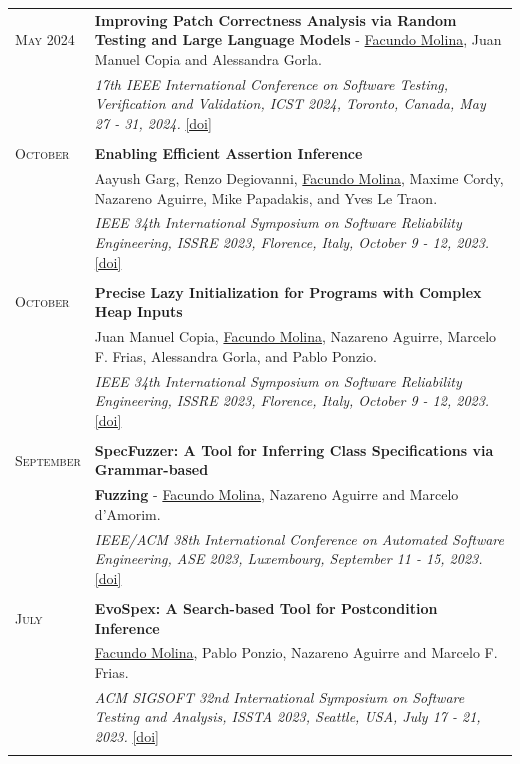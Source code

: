 \documentclass[a4paper,10pt]{article} %
\begin{document}
\begin{longtable}{>{\raggedleft\arraybackslash}p{} p{}}
\textsc{May} 2024 & \textbf{Improving Patch Correctness Analysis via Random Testing and Large Language Models} - \underline{Facundo Molina}, Juan Manuel Copia and Alessandra Gorla. \\
        & \textit{17th IEEE International Conference on Software Testing, Verification and Validation, ICST 2024, Toronto, Canada, May 27 - 31, 2024.} \href{https://doi.org/10.1109/ICST60714.2024.00036}{[doi]} \\ & \\

\textsc{October}  & \textbf{Enabling Efficient Assertion Inference} \\
        2023 & Aayush Garg, Renzo Degiovanni, \underline{Facundo Molina}, Maxime Cordy, Nazareno Aguirre, Mike Papadakis, and Yves Le Traon. \\
        & \textit{IEEE 34th International Symposium on Software Reliability Engineering, ISSRE 2023, Florence, Italy, October 9 - 12, 2023.} \href{https://doi.ieeecomputersociety.org/10.1109/ISSRE59848.2023.00039}{[doi]}\\ & \\

\textsc{October}  & \textbf{Precise Lazy Initialization for Programs with Complex Heap Inputs} \\
        2023 & Juan Manuel Copia, \underline{Facundo Molina}, Nazareno Aguirre, Marcelo F. Frias, Alessandra Gorla, and Pablo Ponzio. \\
        & \textit{IEEE 34th International Symposium on Software Reliability Engineering, ISSRE 2023, Florence, Italy, October 9 - 12, 2023.} \href{https://doi.ieeecomputersociety.org/10.1109/ISSRE59848.2023.00080}{[doi]}\\ & \\

\textsc{September} & \textbf{SpecFuzzer: A Tool for Inferring Class Specifications via Grammar-based} \\
        2023 & \textbf{Fuzzing} - \underline{Facundo Molina}, Nazareno Aguirre and Marcelo d'Amorim. \\
        & \textit{IEEE/ACM 38th International Conference on Automated Software Engineering, ASE 2023, Luxembourg, September 11 - 15, 2023.} \href{https://doi.ieeecomputersociety.org/10.1109/ASE56229.2023.00024}{[doi]}\\ & \\

\textsc{July}  & \textbf{EvoSpex: A Search-based Tool for Postcondition Inference} \\
2023 & \underline{Facundo Molina}, Pablo Ponzio, Nazareno Aguirre and Marcelo F. Frias. \\
& \textit{ACM SIGSOFT 32nd International Symposium on Software Testing and Analysis, ISSTA 2023, Seattle, USA, July 17 - 21, 2023.} \href{https://dl.acm.org/doi/abs/10.1145/3597926.3604928}{[doi]} \\ & \\


\end{longtable}
\end{document}
